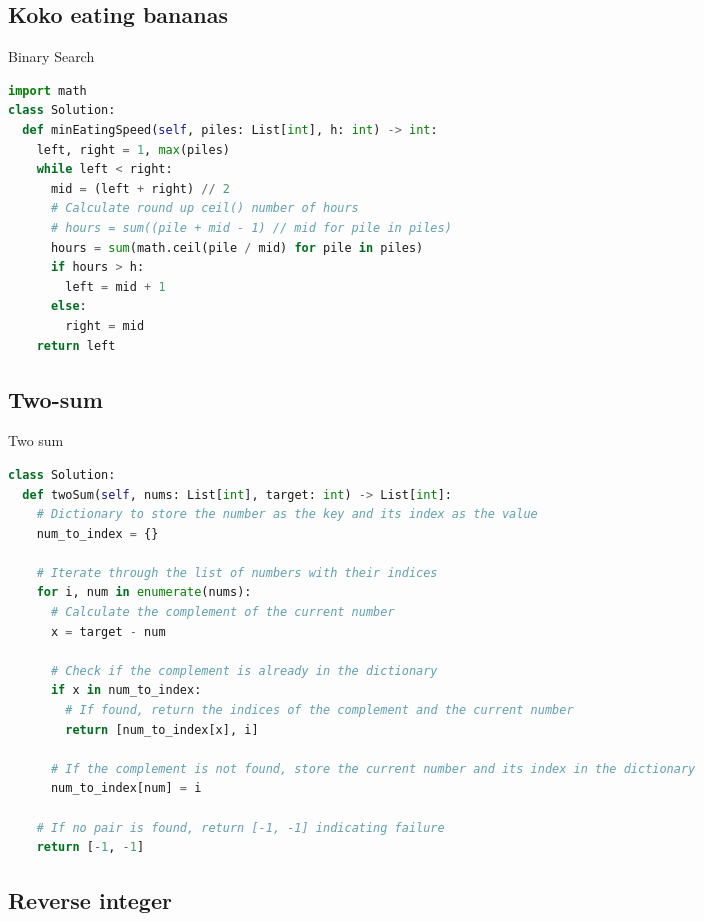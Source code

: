 \documentclass[a4paper,12pt]{article}
\begin{document}
\begin{multicols}{2}
\subsection{Koko eating bananas}
\begin{mycode}[label={lst:koko-eating-bananas}]{Binary Search}
\begin{lstlisting}[language=Python]
import math
class Solution:
  def minEatingSpeed(self, piles: List[int], h: int) -> int:
    left, right = 1, max(piles)
    while left < right:
      mid = (left + right) // 2
      # Calculate round up ceil() number of hours
      # hours = sum((pile + mid - 1) // mid for pile in piles)
      hours = sum(math.ceil(pile / mid) for pile in piles)
      if hours > h:
        left = mid + 1
      else:
        right = mid
    return left
\end{lstlisting}
\end{mycode}


\subsection{Two-sum}

\begin{mycode}[label={lst:Two sum}]{Two sum}
\begin{lstlisting}[language=Python]
class Solution:
  def twoSum(self, nums: List[int], target: int) -> List[int]:
    # Dictionary to store the number as the key and its index as the value
    num_to_index = {}
    
    # Iterate through the list of numbers with their indices
    for i, num in enumerate(nums):
      # Calculate the complement of the current number
      x = target - num
      
      # Check if the complement is already in the dictionary
      if x in num_to_index:
        # If found, return the indices of the complement and the current number
        return [num_to_index[x], i]
      
      # If the complement is not found, store the current number and its index in the dictionary
      num_to_index[num] = i
    
    # If no pair is found, return [-1, -1] indicating failure
    return [-1, -1]
\end{lstlisting}
\end{mycode}

\subsection{Reverse integer}


\end{multicols}
\end{document}
